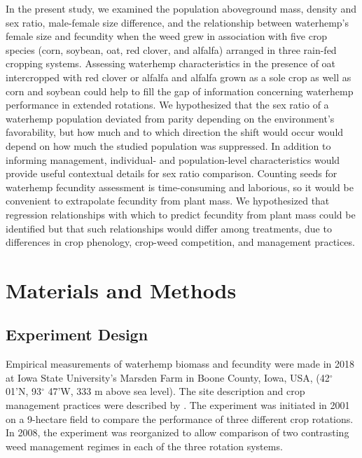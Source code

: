 \documentclass[
]{article}
\begin{document}
In the present study, we examined the population aboveground mass, density and sex ratio, male-female size difference, and the relationship between waterhemp's female size and fecundity when the weed grew in association with five crop species (corn, soybean, oat, red clover, and alfalfa) arranged in three rain-fed cropping systems. Assessing waterhemp characteristics in the presence of oat intercropped with red clover or alfalfa and alfalfa grown as a sole crop as well as corn and soybean could help to fill the gap of information concerning waterhemp performance in extended rotations. We hypothesized that the sex ratio of a waterhemp population deviated from parity depending on the environment's favorability, but how much and to which direction the shift would occur would depend on how much the studied population was suppressed. In addition to informing management, individual- and population-level characteristics would provide useful contextual details for sex ratio comparison. Counting seeds for waterhemp fecundity assessment is time-consuming and laborious, so it would be convenient to extrapolate fecundity from plant mass. We hypothesized that regression relationships with which to predict fecundity from plant mass could be identified but that such relationships would differ among treatments, due to differences in crop phenology, crop-weed competition, and management practices.

\hypertarget{materials-and-methods}{%
\section*{Materials and Methods}\label{materials-and-methods}}

\hypertarget{experiment-design}{%
\subsection*{Experiment Design}\label{experiment-design}}

Empirical measurements of waterhemp biomass and fecundity were made in 2018 at Iowa State University's Marsden Farm in Boone County, Iowa, USA, (42\(^\circ\) 01'N, 93\(^\circ\) 47'W, 333 m above sea level). The site description and crop management practices were described by \citet{liebmanWeedSeedbankDiversity2021}. The experiment was initiated in 2001 on a 9-hectare field to compare the performance of three different crop rotations. In 2008, the experiment was reorganized to allow comparison of two contrasting weed management regimes in each of the three rotation systems.
\end{document}

